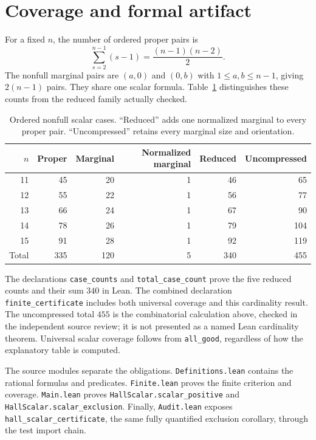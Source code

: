 \documentclass[11pt]{article}
\newcommand{\code}[1]{\texttt{\small #1}}
\begin{document}
\section{Coverage and formal artifact}

For a fixed $n$, the number of ordered proper pairs is
\[
 \sum_{s=2}^{n-1}(s-1)=\frac{(n-1)(n-2)}2.
\]
The nonfull marginal pairs are $(a,0)$ and $(0,b)$ with
$1\leq a,b\leq n-1$, giving $2(n-1)$ pairs. They share one
scalar formula. Table~\ref{tab:coverage} distinguishes these counts
from the reduced family actually checked.

\begin{table}[ht]
\centering
\begin{tabular}{@{}rrrrrr@{}}
\toprule
$n$ & Proper & Marginal & Normalized marginal & Reduced & Uncompressed\\
\midrule
11 &45&20&1&46&65\\
12 &55&22&1&56&77\\
13 &66&24&1&67&90\\
14 &78&26&1&79&104\\
15 &91&28&1&92&119\\
\midrule
Total &335&120&5&340&455\\
\bottomrule
\end{tabular}
\caption{Ordered nonfull scalar cases. ``Reduced'' adds one normalized
marginal to every proper pair. ``Uncompressed'' retains every marginal
size and orientation.}\label{tab:coverage}
\end{table}

The declarations \code{case\_counts} and \code{total\_case\_count}
prove the five reduced counts and their sum $340$ in Lean.
The combined declaration \code{finite\_certificate} includes both
universal coverage and this cardinality result. The uncompressed total
$455$ is the combinatorial calculation above, checked in the independent
source review; it is not presented as a named Lean cardinality theorem.
Universal scalar coverage follows from \code{all\_good}, regardless
of how the explanatory table is computed.

The source modules separate the obligations. \code{Definitions.lean}
contains the rational formulas and predicates. \code{Finite.lean}
proves the finite criterion and coverage. \code{Main.lean} proves
\code{HallScalar.scalar\_positive} and
\code{HallScalar.scalar\_exclusion}. Finally, \code{Audit.lean}
exposes \code{hall\_scalar\_certificate}, the same fully quantified
exclusion corollary, through the test import chain.
\end{document}
